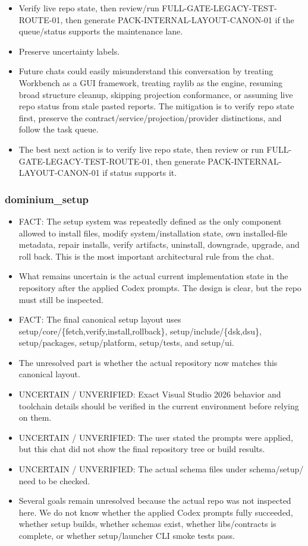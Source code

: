 \documentclass[11pt,a4paper]{report}
\begin{document}
\begin{itemize}
\item Verify live repo state, then review/run FULL-GATE-LEGACY-TEST-ROUTE-01, then generate PACK-INTERNAL-LAYOUT-CANON-01 if the queue/status supports the maintenance lane.
\item Preserve uncertainty labels.
\item Future chats could easily misunderstand this conversation by treating Workbench as a GUI framework, treating raylib as the engine, resuming broad structure cleanup, skipping projection conformance, or assuming live repo status from stale pasted reports. The mitigation is to verify repo state first, preserve the contract/service/projection/provider distinctions, and follow the task queue.
\item The best next action is to verify live repo state, then review or run FULL-GATE-LEGACY-TEST-ROUTE-01, then generate PACK-INTERNAL-LAYOUT-CANON-01 if status supports it.
\end{itemize}

\subsubsection{dominium\_setup}

\begin{itemize}
\item FACT: The setup system was repeatedly defined as the only component allowed to install files, modify system/installation state, own installed-file metadata, repair installs, verify artifacts, uninstall, downgrade, upgrade, and roll back. This is the most important architectural rule from the chat.
\item What remains uncertain is the actual current implementation state in the repository after the applied Codex prompts. The design is clear, but the repo must still be inspected.
\item FACT: The final canonical setup layout uses setup/core/\{fetch,verify,install,rollback\}, setup/include/\{dsk,dsu\}, setup/packages, setup/platform, setup/tests, and setup/ui.
\item The unresolved part is whether the actual repository now matches this canonical layout.
\item UNCERTAIN / UNVERIFIED: Exact Visual Studio 2026 behavior and toolchain details should be verified in the current environment before relying on them.
\item UNCERTAIN / UNVERIFIED: The user stated the prompts were applied, but this chat did not show the final repository tree or build results.
\item UNCERTAIN / UNVERIFIED: The actual schema files under schema/setup/ need to be checked.
\item Several goals remain unresolved because the actual repo was not inspected here. We do not know whether the applied Codex prompts fully succeeded, whether setup builds, whether schemas exist, whether libs/contracts is complete, or whether setup/launcher CLI smoke tests pass.
\end{itemize}
\end{document}
